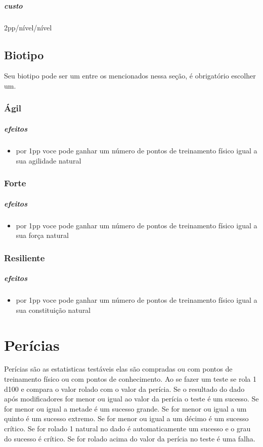 \paragraph{custo} 2pp/nível/nível
%
%
\section{Biotipo}
Seu biotipo pode ser um entre os mencionados nessa seção, é obrigatório escolher um.
\subsection{Ágil}
\paragraph{efeitos}
\begin{itemize}
  \item por 1pp voce pode ganhar um número de pontos de treinamento físico 
    igual a sua agilidade natural
\end{itemize}
\subsection{Forte}
\paragraph{efeitos}
\begin{itemize}
  \item por 1pp voce pode ganhar um número de pontos de treinamento físico 
    igual a sua força natural
\end{itemize}
\subsection{Resiliente}
\paragraph{efeitos}
\begin{itemize}
  \item por 1pp voce pode ganhar um número de pontos de treinamento físico 
    igual a sua constituição natural
\end{itemize}
%
%
%
%
\chapter{Perícias}
Perícias são as estatisticas testáveis elas são compradas ou com pontos de treinamento 
físico ou com pontos de conhecimento.
Ao se fazer um teste se rola 1 d100 e compara o valor rolado com o valor da perícia.
Se o resultado do dado após modificadores for menor ou igual ao valor da perícia o teste é um sucesso.
Se for menor ou igual a metade é um sucesso grande.
Se for menor ou igual a um quinto é um sucesso extremo.
Se for menor ou igual a um décimo é um sucesso crítico.
Se for rolado 1 natural no dado é automaticamente 
um sucesso e o grau do sucesso é crítico.
Se for rolado acima do valor da perícia no teste é uma falha.

